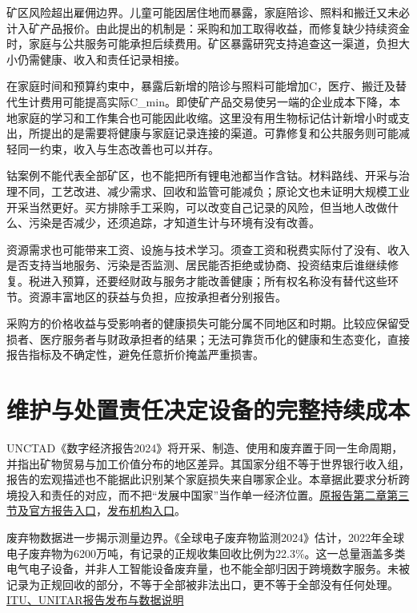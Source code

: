\documentclass[UTF8,fontset=windows,12pt,a4paper,oneside,openany]{ctexbook}
\begin{document}
矿区风险超出雇佣边界。儿童可能因居住地而暴露，家庭陪诊、照料和搬迁又未必计入矿产品报价。由此提出的机制是：采购和加工取得收益，而修复缺少持续资金时，家庭与公共服务可能承担后续费用。矿区暴露研究支持追查这一渠道，负担大小仍需健康、收入和责任记录相接。

在家庭时间和预算约束中，暴露后新增的陪诊与照料可能增加C，医疗、搬迁及替代生计费用可能提高实际C\_min。即使矿产品交易使另一端的企业成本下降，本地家庭的学习和工作集合也可能因此收缩。这里没有用生物标记估计新增小时或支出，所提出的是需要将健康与家庭记录连接的渠道。可靠修复和公共服务则可能减轻同一约束，收入与生态改善也可以并存。

钴案例不能代表全部矿区，也不能把所有锂电池都当作含钴。材料路线、开采与治理不同，工艺改进、减少需求、回收和监管可能减负；原论文也未证明大规模工业开采当然更好。买方排除手工采购，可以改变自己记录的风险，但当地人改做什么、污染是否减少，还须追踪，才知道生计与环境有没有改善。

资源需求也可能带来工资、设施与技术学习。须查工资和税费实际付了没有、收入是否支持当地服务、污染是否监测、居民能否拒绝或协商、投资结束后谁继续修复。税进入预算，还要经财政与服务才能改善健康；所有权名称没有替代这些环节。资源丰富地区的获益与负担，应按承担者分别报告。

采购方的价格收益与受影响者的健康损失可能分属不同地区和时期。比较应保留受损者、医疗服务者与财政承担者的结果；无法可靠货币化的健康和生态变化，直接报告指标及不确定性，避免任意折价掩盖严重损害。

\section{维护与处置责任决定设备的完整持续成本}

UNCTAD《数字经济报告2024》将开采、制造、使用和废弃置于同一生命周期，并指出矿物贸易与加工价值分布的地区差异。其国家分组不等于世界银行收入组，报告的宏观描述也不能据此识别某个家庭损失来自哪家企业。本章据此要求分析跨境投入和责任的对应，而不把“发展中国家”当作单一经济位置。\href{https://unctad.org/system/files/official-document/der2024_en.pdf}{原报告第二章第三节及官方报告入口}，\href{https://unctad.org/publication/digital-economy-report-2024}{发布机构入口}。

废弃物数据进一步揭示测量边界。《全球电子废弃物监测2024》估计，2022年全球电子废弃物为6200万吨，有记录的正规收集回收比例为22.3\%。这一总量涵盖多类电气电子设备，并非人工智能设备废弃量，也不能全部归因于跨境数字服务。未被记录为正规回收的部分，不等于全部被非法出口，更不等于全部没有任何处理。\href{https://ewastemonitor.info/the-global-e-waste-monitor-2024/}{ITU、UNITAR报告发布与数据说明}
\end{document}
